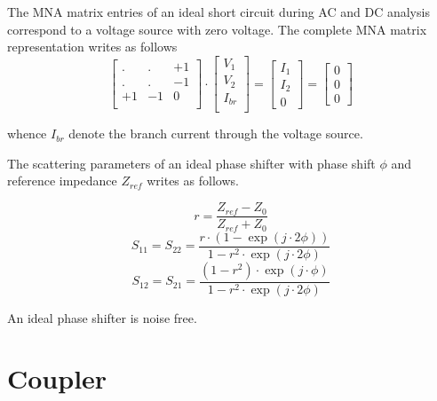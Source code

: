 The MNA matrix entries of an ideal short circuit during AC and DC
analysis correspond to a voltage source with zero voltage.  The
complete MNA matrix representation writes as follows
\begin{equation}
\begin{bmatrix}
. & . & +1\\
. & . & -1\\
+1 & -1 & 0\\
\end{bmatrix}
\cdot
\begin{bmatrix}
V_1\\
V_2\\
I_{br}\\
\end{bmatrix}
=
\begin{bmatrix}
I_1\\
I_2\\
0
\end{bmatrix}
=
\begin{bmatrix}
0\\
0\\
0
\end{bmatrix}
\end{equation}

whence $I_{br}$ denote the branch current through the voltage source.

\addvspace{12pt}

The scattering parameters of an ideal phase shifter with phase shift
$\phi$ and reference impedance $Z_{ref}$ writes as follows.

\begin{equation}
r = \frac{Z_{ref}-Z_0}{Z_{ref}+Z_0}
\end{equation}
\begin{equation}
S_{11} = S_{22} = \frac{r\cdot\left(1-\exp\left(j\cdot 2\phi\right)\right)}{1-r^2\cdot\exp\left(j\cdot 2\phi\right)}
\end{equation}
\begin{equation}
S_{12} = S_{21} = \frac{(1-r^2)\cdot\exp\left(j\cdot\phi\right)}{1-r^2\cdot\exp\left(j\cdot 2\phi\right)}
\end{equation}

An ideal phase shifter is noise free.


\section{Coupler}

